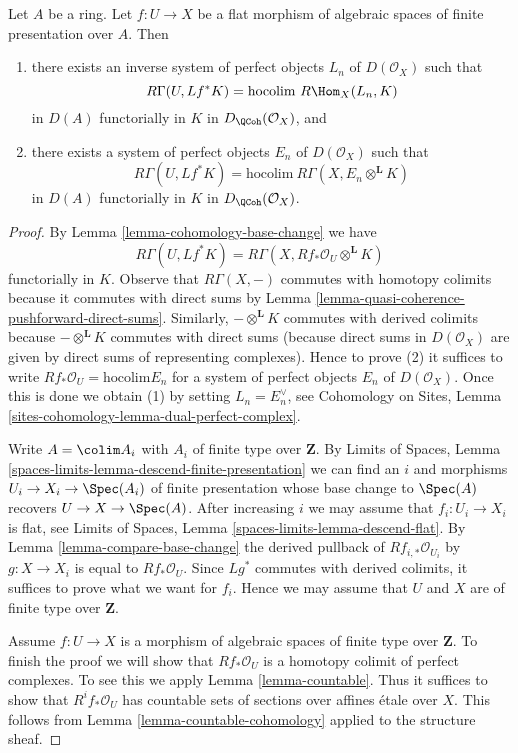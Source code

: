 \begin{lemma}
\label{lemma-computing-sections-as-colim}
Let $A$ be a ring. Let $f : U \to X$ be a flat morphism of algebraic spaces
of finite presentation over $A$. Then
\begin{enumerate}
\item there exists an inverse system of perfect objects $L_n$ of
$D(\mathcal{O}_X)$ such that
$$
R\Gamma(U, Lf^*K) = \text{hocolim}\ R\Hom_X(L_n, K)
$$
in $D(A)$ functorially in $K$ in $D_\QCoh(\mathcal{O}_X)$, and
\item there exists a system of perfect objects $E_n$ of
$D(\mathcal{O}_X)$ such that
$$
R\Gamma(U, Lf^*K) = \text{hocolim}\ R\Gamma(X, E_n \otimes^\mathbf{L} K)
$$
in $D(A)$ functorially in $K$ in $D_\QCoh(\mathcal{O}_X)$.
\end{enumerate}
\end{lemma}

\begin{proof}
By Lemma \ref{lemma-cohomology-base-change} we have
$$
R\Gamma(U, Lf^*K) = R\Gamma(X, Rf_*\mathcal{O}_U \otimes^\mathbf{L} K)
$$
functorially in $K$. Observe that $R\Gamma(X, -)$ commutes with
homotopy colimits because it commutes with direct sums by
Lemma \ref{lemma-quasi-coherence-pushforward-direct-sums}.
Similarly, $- \otimes^\mathbf{L} K$ commutes with derived colimits
because $- \otimes^\mathbf{L} K$ commutes with direct sums
(because direct sums in $D(\mathcal{O}_X)$
are given by direct sums of representing complexes).
Hence to prove (2) it suffices to write
$Rf_*\mathcal{O}_U = \text{hocolim} E_n$ for a system of
perfect objects $E_n$ of $D(\mathcal{O}_X)$. Once this is done
we obtain (1) by setting $L_n = E_n^\vee$, see Cohomology on Sites,
Lemma \ref{sites-cohomology-lemma-dual-perfect-complex}.

\medskip\noindent
Write $A = \colim A_i$ with $A_i$ of finite type over $\mathbf{Z}$. By
Limits of Spaces, Lemma \ref{spaces-limits-lemma-descend-finite-presentation}
we can find an $i$ and morphisms $U_i \to X_i \to \Spec(A_i)$
of finite presentation whose base change to $\Spec(A)$ recovers
$U \to X \to \Spec(A)$.
After increasing $i$ we may assume that $f_i : U_i \to X_i$ is
flat, see Limits of Spaces, Lemma
\ref{spaces-limits-lemma-descend-flat}.
By Lemma \ref{lemma-compare-base-change}
the derived pullback of $Rf_{i, *}\mathcal{O}_{U_i}$
by $g : X \to X_i$ is equal to $Rf_*\mathcal{O}_U$.
Since $Lg^*$ commutes with derived colimits, it suffices
to prove what we want for $f_i$. Hence we may assume that
$U$ and $X$ are of finite type over $\mathbf{Z}$.

\medskip\noindent
Assume $f : U \to X$ is a morphism of algebraic spaces
of finite type over $\mathbf{Z}$. To finish the proof
we will show that $Rf_*\mathcal{O}_U$ is a homotopy
colimit of perfect complexes. To see this we apply Lemma \ref{lemma-countable}.
Thus it suffices to show that $R^if_*\mathcal{O}_U$
has countable sets of sections over affines \'etale over $X$.
This follows from Lemma \ref{lemma-countable-cohomology}
applied to the structure sheaf.
\end{proof}















